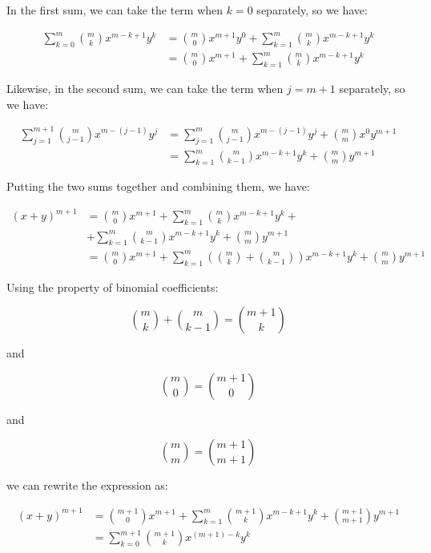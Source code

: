 \documentclass[12pt, letterpaper, oneside]{article}
\begin{document}
In the first sum, we can take the term when \(k = 0\) separately, so we have:

\begin{align*}
  \sum_{k=0}^{m} \binom{m}{k} x^{m-k+1} y^k & = \binom{m}{0} x^{m+1} y^0 + \sum_{k=1}^{m} \binom{m}{k} x^{m-k+1} y^k \\
                                            & = \binom{m}{0} x^{m+1} + \sum_{k=1}^{m} \binom{m}{k} x^{m-k+1} y^k
\end{align*}

Likewise, in the second sum, we can take the term when \(j = m + 1\) separately, so we have:

\begin{align*}
  \sum_{j=1}^{m+1} \binom{m}{j-1} x^{m-(j-1)} y^j & = \sum_{j=1}^{m} \binom{m}{j-1} x^{m-(j-1)} y^j + \binom{m}{m} x^0 y^{m+1} \\
                                                  & = \sum_{k=1}^{m} \binom{m}{k-1} x^{m-k+1} y^k + \binom{m}{m} y^{m+1}
\end{align*}

Putting the two sums together and combining them, we have:

\begin{align*}
  (x + y)^{m+1} & = \binom{m}{0} x^{m+1} + \sum_{k=1}^{m} \binom{m}{k} x^{m-k+1} y^k + \\
                & + \sum_{k=1}^{m} \binom{m}{k-1} x^{m-k+1} y^k + \binom{m}{m} y^{m+1} \\
                & = \binom{m}{0} x^{m+1} + \sum_{k=1}^{m} \left(\binom{m}{k} + \binom{m}{k-1}\right) x^{m-k+1} y^k + \binom{m}{m} y^{m+1}
\end{align*}

Using the property of binomial coefficients:

\[\binom{m}{k} + \binom{m}{k-1} = \binom{m+1}{k}\]

and

\[\binom{m}{0} = \binom{m+1}{0}\]

and

\[\binom{m}{m} = \binom{m+1}{m+1}\]

we can rewrite the expression as:

\begin{align*}
  (x + y)^{m+1} & = \binom{m+1}{0} x^{m+1} + \sum_{k=1}^{m} \binom{m+1}{k} x^{m-k+1} y^k + \binom{m+1}{m+1} y^{m+1} \\
                & = \sum_{k=0}^{m+1} \binom{m+1}{k} x^{(m+1)-k} y^k
\end{align*}
\end{document}
